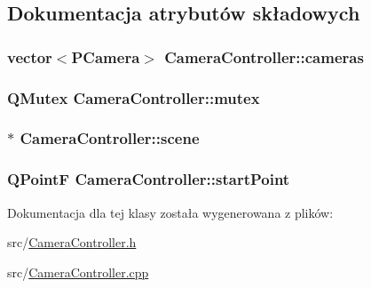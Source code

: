 \subsection{Dokumentacja atrybutów składowych}
\hypertarget{class_camera_controller_a6d21a2335946e594c0042a9276664947}{
\subsubsection[{cameras}]{\setlength{\rightskip}{0pt plus 5cm}vector$<${\bf P\-Camera}$>$ Camera\-Controller\-::cameras\hspace{0.3cm}{\ttfamily [private]}}}\label{class_camera_controller_a6d21a2335946e594c0042a9276664947}
\hypertarget{class_camera_controller_aec489f25af8a257b11335df3203a0ed9}{
\subsubsection[{mutex}]{\setlength{\rightskip}{0pt plus 5cm}Q\-Mutex Camera\-Controller\-::mutex\hspace{0.3cm}{\ttfamily [private]}}}\label{class_camera_controller_aec489f25af8a257b11335df3203a0ed9}
\hypertarget{class_camera_controller_a9213699a725a3085bad9b6689b1b8917}{
\subsubsection[{scene}]{$\ast$ Camera\-Controller\-::scene\hspace{0.3cm}{\ttfamily [private]}}}\label{class_camera_controller_a9213699a725a3085bad9b6689b1b8917}
\hypertarget{class_camera_controller_ad8ca257426868d312798b902a8c12cb7}{
\subsubsection[{start\-Point}]{\setlength{\rightskip}{0pt plus 5cm}Q\-Point\-F Camera\-Controller\-::start\-Point\hspace{0.3cm}{\ttfamily [private]}}}\label{class_camera_controller_ad8ca257426868d312798b902a8c12cb7}


Dokumentacja dla tej klasy została wygenerowana z plików\-:\begin{DoxyCompactItemize}
\item 
src/\hyperlink{_camera_controller_8h}{Camera\-Controller.\-h}\item 
src/\hyperlink{_camera_controller_8cpp}{Camera\-Controller.\-cpp}\end{DoxyCompactItemize}
